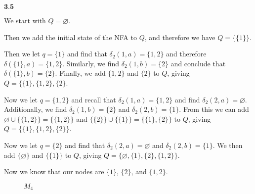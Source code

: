 \documentclass{article}
\newcommand{\problem}[1]{$\boxed{\textbf{#1}}$}
\begin{document}
\begin{minipage}{\textwidth}
\problem{3.5}

We start with $Q=\varnothing$.

Then we add the initial state of the NFA to $Q$, and therefore we have
$Q=\{\{1\}\}$.

Then we let $q=\{1\}$ and find that $\delta_2(1,a)=\{1,2\}$ and
therefore $\delta(\{1\},a)=\{1,2\}$. Similarly, we find
$\delta_2(1,b)=\{2\}$ and conclude that
$\delta(\{1\},b)=\{2\}$. Finally, we add $\{1,2\}$ and $\{2\}$ to $Q$,
giving $Q=\{\{1\},\{1,2\},\{2\}$.

Now we let $q=\{1,2\}$ and recall that $\delta_2(1,a)=\{1,2\}$ and
find $\delta_2(2,a)=\varnothing$. Additionally, we find
$\delta_2(1,b)=\{2\}$ and $\delta_2(2,b)=\{1\}$. From this we can add
$\varnothing\cup\{\{1,2\}\}=\{\{1,2\}\}$ and
$\{\{2\}\}\cup\{\{1\}\}=\{\{1\},\{2\}\}$ to $Q$, giving
$Q=\{\{1\},\{1,2\},\{2\}\}$.

Now we let $q=\{2\}$ and find that $\delta_2(2,a)=\varnothing$ and
$\delta_2(2,b)=\{1\}$. We then add $\{\varnothing\}$ and $\{\{1\}\}$
to $Q$, giving $Q=\{\varnothing,\{1\},\{2\},\{1,2\}\}$.

Now we know that our nodes are $\{1\}$, $\{2\}$, and $\{1,2\}$.

\begin{figure}[H]
  \centering
  \caption{$M_4$}
\end{figure}
\end{minipage}
\end{document}
